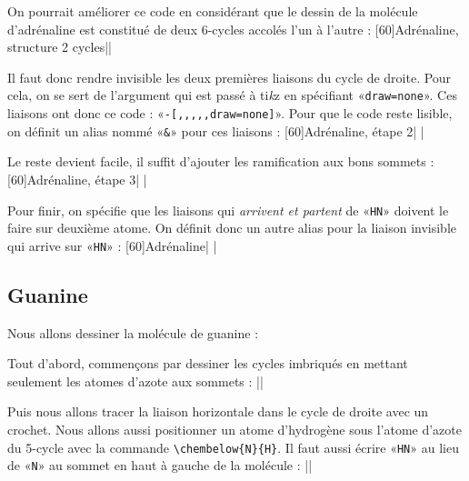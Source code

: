 \documentclass[10pt,french]{article}
\makeatletter
\newcommand\make@car@active[1]{%
	\catcode`#1\active
	\begingroup
		\lccode`\~`#1\relax
		\lowercase{\endgroup\def~}%
}
\newif\if@exstar
\newcommand\exemple{%
	\begingroup
	\parskip\z@
	\@makeother\;\@makeother\!\@makeother\?\@makeother\:%
	\@ifstar{\@exstartrue\exemple@}{\@exstarfalse\exemple@}}
\newcommand\exemple@[2][65]{%
	\medbreak\noindent
	\begingroup
		\let\do\@makeother\dospecials
		\make@car@active\ { {}}%
		\make@car@active\^^M{\par\leavevmode}%
		\make@car@active\^^I{\space\space}%
		\make@car@active\,{\leavevmode\kern\z@\string,}%
		\make@car@active\-{\leavevmode\kern\z@\string-}%
		\make@car@active\>{\leavevmode\kern\z@\string>}%
		\make@car@active\<{\leavevmode\kern\z@\string<}%
		\exemple@@{#1}{#2}%
}
\newcommand\exemple@@[3]{%
	\def\@tempa##1#3{\exemple@@@{#1}{#2}{##1}}%
	\@tempa
}
\newcommand\exemple@@@[3]{%
	\xdef\the@code{#3}%
	\endgroup
	\if@exstar
		\begingroup
			\fboxrule0.4pt
			\let\breakboxparindent\z@
			\def\bkvz@bottom{\hrule\@height\fboxrule}%
			\let\bkvz@before@breakbox\relax
			\def\bkvz@set@linewidth{\advance\linewidth\dimexpr-2\fboxrule-2\fboxsep}%
			\def\bkvz@left{\vrule\@width\fboxrule\hskip\fboxsep}%
			\def\bkvz@right{\hskip\fboxsep\vrule\@width\fboxrule}%
			\def\bkvz@top{\hbox to \hsize{%
				\vrule\@width\fboxrule\@height\fboxrule
				\leaders\bkvz@bottom\hfill
				\sffamily
				\fboxsep\z@
				\colorbox{black}{\kern0.25em\color{white}\footnotesize\lower0.5ex\hbox{\strut#2}\kern0.25em}%
				\leaders\bkvz@bottom\hfill
				\vrule\@width\fboxrule\@height\fboxrule}}%
			\breakbox
				\kern.5ex\relax
				\ttfamily\footnotesize\the@code\par
				\normalfont
				\kern3pt
				\hrule height0.1pt width\linewidth depth0.1pt
				\vskip5pt
				\rightskip0pt plus 1fill
				\everypar{{\color{lightgray}\rlap{\vrule height0.1pt width\linewidth depth0.1pt}}\hskip0pt plus 1fill}%
				\newlinechar`\^^M\everyeof{\noexpand}\scantokens{#3}\par
			\endbreakbox
		\endgroup
	\else
		\vskip0.5ex
		\boxput*(0,1)
			{\fboxsep\z@
			\hbox{\sffamily\colorbox{black}{\leavevmode\kern0.25em{\color{white}\footnotesize\strut#2}\kern0.25em}}%
			}%
			{\fboxsep5pt
			\fbox{%
				$\vcenter{\hsize\dimexpr0.#1\linewidth-\fboxsep-\fboxrule\relax
					\kern5pt\parskip0pt \ttfamily\footnotesize\the@code}%
				\vcenter{\kern5pt\hsize\dimexpr\linewidth-0.#1\linewidth-\fboxsep-\fboxrule\relax
					\everypar{{\color{lightgray}\rlap{\vrule height0.1pt width\dimexpr\linewidth-0.#1\linewidth-\fboxsep-\fboxrule depth0.1pt}}}%
					\footnotesize\newlinechar`\^^M\everyeof{\noexpand}\scantokens{#3}}$%
				}%
			}%
	\fi
	\medbreak
	\endgroup
}
\let\do\@makeother\dospecials
\newcommand\TIKZ{ti\textit kz\xspace}
\makeatother
\begin{document}
On pourrait améliorer ce code en considérant que le dessin de la molécule d'adrénaline est constitué de deux 6-cycles accolés l'un à l'autre :
\exemple[60]{Adrénaline, structure 2 cycles}||

Il faut donc rendre invisible les deux premières liaisons du cycle de droite. Pour cela, on se sert de l'argument qui est passé à \TIKZ en spécifiant «\verb-draw=none-». Ces liaisons ont donc ce code : «\verb/-[,,,,,draw=none]/». Pour que le code reste lisible, on définit un alias nommé «\verb-&-» pour ces liaisons :
\exemple[60]{Adrénaline, étape 2}|
|

Le reste devient facile, il suffit d'ajouter les ramification aux bons sommets :
\exemple[60]{Adrénaline, étape 3}|
|

Pour finir, on spécifie que les liaisons qui \emph{arrivent et partent} de «\verb-HN-» doivent le faire sur deuxième atome. On définit donc un autre alias pour la liaison invisible qui arrive sur «\verb-HN-» :
\exemple[60]{Adrénaline}|
|

\subsection{Guanine}
Nous allons dessiner la molécule de guanine :
\medskip

Tout d'abord, commençons par dessiner les cycles imbriqués en mettant seulement les atomes d'azote aux sommets :
\exemple{Guanine, structure}||

Puis nous allons tracer la liaison horizontale dans le cycle de droite avec un crochet. Nous allons aussi positionner un atome d'hydrogène sous l'atome d'azote du 5-cycle avec la commande \verb-\chembelow{N}{H}-. Il faut aussi écrire «\verb-HN-» au lieu de «\verb-N-» au sommet en haut à gauche de la molécule :
\exemple{Guanine, étape 2}||
\end{document}
